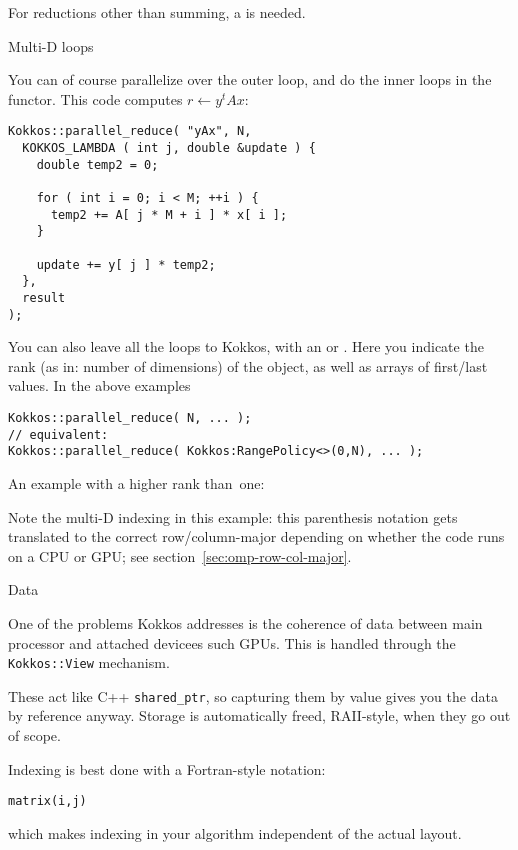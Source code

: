 For reductions other than summing, a  is needed.
%

 {Multi-D loops}

You can of course parallelize over the outer loop, and do the inner loops
in the functor.
This code computes $r\leftarrow y^tAx$:
%
\begin{lstlisting}
Kokkos::parallel_reduce( "yAx", N,
  KOKKOS_LAMBDA ( int j, double &update ) {
    double temp2 = 0;

    for ( int i = 0; i < M; ++i ) {
      temp2 += A[ j * M + i ] * x[ i ];
    }

    update += y[ j ] * temp2;
  },
  result
);  
\end{lstlisting}

You can also leave all the loops to Kokkos, with an
 or .
Here you indicate the rank (as in: number of dimensions) of the object,
as well as arrays of first/last values.
In the above examples
\begin{lstlisting}
Kokkos::parallel_reduce( N, ... );
// equivalent: 
Kokkos::parallel_reduce( Kokkos:RangePolicy<>(0,N), ... );  
\end{lstlisting}

An example with a higher rank than~one:
%

Note the multi-D indexing in this example: this parenthesis notation
gets translated to the correct row/column-major depending on whether the
code runs on a CPU or GPU; see section~\ref{sec:omp-row-col-major}.

 {Data}

One of the problems Kokkos addresses is the coherence of data between
main processor and attached devicees such \acp{GPU}.
This is handled through the \lstinline+Kokkos::View+ mechanism.


These act like C++ \lstinline+shared_ptr+, so capturing them by value
gives you the data by reference anyway.
Storage is automatically freed, RAII-style,
when they go out of scope.

Indexing is best done with a Fortran-style notation:
\begin{lstlisting}
matrix(i,j)
\end{lstlisting}
which makes indexing in your algorithm independent
of the actual layout.

